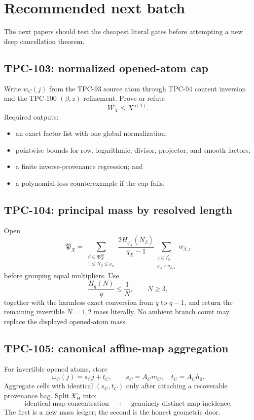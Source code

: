 \section{Recommended next batch}
\label{sec:next-batch}

The next papers should test the cheapest literal gates before
attempting a new deep cancellation theorem.

\subsection*{TPC-103: normalized opened-atom cap}

Write \(w_C(j)\) from the TPC-93 source atom through TPC-94 content
inversion and the TPC-100 \((\beta,z)\) refinement.  Prove or refute
\[
 W_X\le X^{o(1)}.
\]
Required outputs:
\begin{itemize}[leftmargin=2em]
\item an exact factor list with one global normalization;
\item pointwise bounds for row, logarithmic, divisor, projector, and
  smooth factors;
\item a finite inverse-provenance regression; and
\item a polynomial-loss counterexample if the cap fails.
\end{itemize}

\subsection*{TPC-104: principal mass by resolved length}

Open
\[
 \mathfrak P_X
 =
 \sum_{\substack{\beta\in\mathfrak B_X^{\mathrm{nc}}\\
                   1\le N_\beta\le q_X}}
 \frac{2H_{q_X}(N_\beta)}{q_X-1}
 \sum_{\substack{z\in I_\beta^\ast\\
                   q_X\nmid u_{\beta,z}}}
 w_{\beta,z}
\]
before grouping equal multipliers.  Use
\[
 \frac{H_q(N)}q\le\frac1N,\qquad N\ge3,
\]
together with the harmless exact conversion from \(q\) to \(q-1\),
and return the remaining invertible \(N=1,2\) mass literally.  No
ambient branch count may replace the displayed opened-atom mass.

\subsection*{TPC-105: canonical affine-map aggregation}

For invertible opened atoms, store
\[
 \omega_C(j)=s_Cj+t_C,\qquad
 s_C=A_Cm_C,\quad t_C=A_Ch_0.
\]
Aggregate cells with identical \((s_C,t_C)\) only after attaching a
recoverable provenance bag.  Split
\(\mathfrak X_H^\circ\) into:
\[
 \text{identical-map concentration}
 \quad+\quad
 \text{genuinely distinct-map incidence}.
\]
The first is a new mass ledger; the second is the honest geometric
door.


